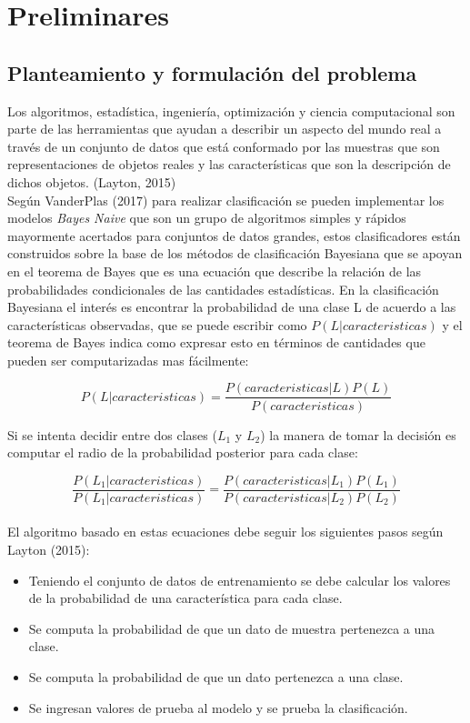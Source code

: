 \chapter{Preliminares}

\section{Planteamiento y formulaci\'on del problema}

Los algoritmos, estadística, ingeniería, optimización y ciencia computacional son parte de las herramientas que ayudan a describir un aspecto del mundo real a través de un conjunto de datos que está conformado por las muestras que son representaciones de objetos reales y las características que son la descripción de dichos objetos. (Layton, 2015)\\

Según VanderPlas (2017) para realizar clasificación se pueden implementar los modelos \textit{Bayes Naive} que son un grupo de algoritmos simples y rápidos mayormente acertados para conjuntos de datos grandes, estos clasificadores están construidos sobre la base de los métodos de clasificación Bayesiana que se apoyan en el teorema de Bayes que es una ecuación que describe la relación de las probabilidades condicionales de las cantidades estadísticas. En la clasificación Bayesiana el interés es encontrar la probabilidad de una clase L de acuerdo a las características observadas, que se puede escribir como $P\left(L|caracteristicas\right)$ y el teorema de Bayes indica como expresar esto en términos de cantidades que pueden ser computarizadas mas fácilmente:

\[P\left(L|caracteristicas\right)=\frac{P\left(caracteristicas|L\right)P\left(L\right)}{P\left(caracteristicas\right)}\]
  
Si se intenta decidir entre dos clases ($L_{1}$ y $L_{2}$) la manera de tomar la decisión es computar el radio de la probabilidad posterior para cada clase:

\[\frac{P\left(L_{1}|caracteristicas\right)}{P\left(L_{1}|caracteristicas\right)}=\frac{P\left(caracteristicas|L_{1}\right)P\left(L_{1}\right)}{P\left(caracteristicas|L_{2}\right)P\left(L_{2}\right)}\]\\

El algoritmo basado en estas ecuaciones debe seguir los siguientes pasos según Layton (2015):

\begin{itemize}
	\item Teniendo el conjunto de datos de entrenamiento se debe calcular los valores de la probabilidad de una característica para cada clase.
	\item Se computa la probabilidad de que un dato de muestra pertenezca a una clase.
	\item Se computa la probabilidad de que un dato pertenezca a una clase.
	\item Se ingresan valores de prueba al modelo y se prueba la clasificación.
\end{itemize}

